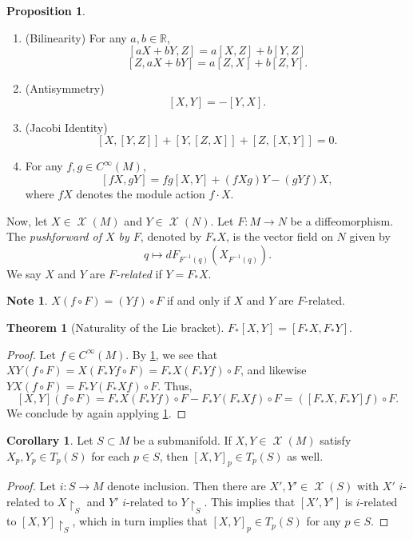 \documentclass[10pt,letterpaper,cm]{nupset}
\theoremstyle{definition}
\newtheorem{note}[definition]{Note}
\theoremstyle{theorem}
\newtheorem{theorem}[definition]{Theorem}
\newtheorem{prop}[definition]{Proposition}
\newtheorem{corollary}[definition]{Corollary}
\theoremstyle{remark}
\newcommand{\R}{\mathbb R}
\newcommand{\1}{\mathbf{1}}
\newcommand{\0}{\vec 0}
\DeclareMathOperator{\vf}{\mathscr{X}}
\begin{document}
\begin{prop} $ $
\begin{enumerate}
\item (Bilinearity) For any $a,b \in \R$, $$[aX + bY, Z] = a[X, Z] + b[Y, Z]$$ $$[Z, aX + bY] = a[Z, X] + b[Z, Y]. $$ 
\item (Antisymmetry) $$[X, Y] = {-[Y,X]}.$$
\item (Jacobi Identity) $$\left[X, [Y, Z]\right]+ \left[Y, [Z, X]\right] + \left[Z, [X, Y]\right] =0  . $$
\item For any $f, g \in C^{\infty}(M)$, $$[fX, gY] = fg[X, Y] + \left(fXg\right)Y - \left(gYf\right)X, $$ where $fX$ denotes the module action $f \cdot X$.
\end{enumerate}
\end{prop}

\medskip


Now, let $X \in \vf(M)$ and $Y \in \vf(N)$. Let $F: M \to N$ be a diffeomorphism. The \textit{pushforward of $X$ by $F$}, denoted by $F_{\ast}X$, is the vector field on $N$ given by $$q \mapsto dF_{F^{-1}(q)}\left(X_{F^{-1}(q)}\right).$$
We say   $X$ and $Y$ are \textit{$F$-related} if $Y = F_{\ast}X$.


\begin{note}\label{relat}
$X(f \circ F) = (Yf) \circ F$ if and only if $X$ and $Y$ are $F$-related.
\end{note}

\begin{theorem}[Naturality of the Lie bracket]
$F_{\ast}[X, Y] = \left[F_{\ast}X, F_{\ast}Y\right]$.
\end{theorem}
\begin{proof}
Let $ f\in C^{\infty}(M)$. By \cref{relat}, we see that $XY(f \circ F) = X(F_{\ast}Yf \circ F) = F_{\ast}X(F_{\ast}Yf) \circ F$, and likewise $YX(f \circ F) = F_{\ast}Y(F_{\ast}X f) \circ F$. Thus, $$[X, Y](f \circ F) = F_{\ast}X(F_{\ast}Yf) \circ F - F_{\ast}Y(F_{\ast}X f) \circ F = \left([F_{\ast}X, F_{\ast}Y] f\right) \circ F.$$ We conclude by again applying \cref{relat}.
\end{proof}

\begin{corollary}
Let $S \subset M$ be a submanifold. If $X, Y \in \vf(M)$ satisfy $X_p, Y_p \in T_p(S)$ for each $p\in S$, then $[X, Y]_p \in T_p(S)$ as well.
\end{corollary}
\begin{proof}
Let $i : S \to M$ denote inclusion. Then  there are $X', Y' \in \vf(S)$ with $X'$ $i$-related to $X\restriction_S$ and $Y'$ $i$-related to $Y\restriction_S$. This implies that $\left[X', Y'\right]$ is $i$-related to $\left[X, Y\right]\restriction_S$, which in turn implies that $\left[X, Y\right]_p \in T_p(S)$ for any $p\in S$.  
\end{proof}
\end{document}
